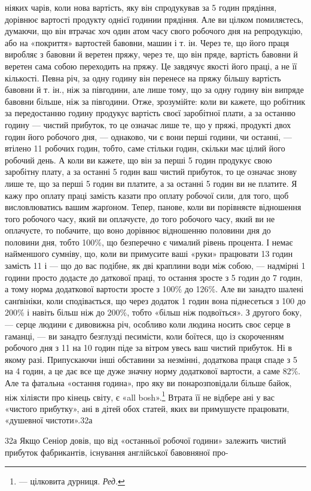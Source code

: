 ніяких чарів, коли нова вартість, яку він спродукував за 5 годин прядіння, дорівнює вартості
продукту однієї годинии прядіння. Але ви цілком помиляєтесь, думаючи, що він втрачає хоч один атом
часу свого робочого дня на репродукцію, або на «покриття» вартостей бавовни, машин і т. ін. Через
те, що його праця виробляє з бавовни й веретен пряжу, через те, що він пряде, вартість бавовни й
веретен сама собою переходить на пряжу.
Це завдячує якості його праці, а не її кількості. Певна річ, за одну годину він перенесе на пряжу
більшу вартість бавовни й т. ін., ніж за півгодини, але лише тому, що за одну годину він випряде
бавовни більше, ніж за півгодини. Отже, зрозумійте: коли ви кажете, що робітник за передостанню
годину продукує вартість своєї заробітної плати, а за останню годину — чистий прибуток, то це
означає лише те, що у пряжі, продукті двох годин його робочого дня, — однаково, чи є вони перші
години, чи останні, — втілено 11 робочих годин, тобто, саме стільки годин, скільки має цілий
його робочий день. А коли ви кажете, що він за перші 5 годин продукує свою заробітну плату, а за
останні 5 годин ваш чистий прибуток, то це означає знову лише те, що за перші 5 годин ви
платите, а за останні 5 годин
ви не платите. Я кажу про оплату праці замість казати про оплату робочої сили, для того, щоб
висловлюватись вашим жарґоном. Тепер, панове, коли ви порівняєте відношення того робочого
часу, який ви оплачуєте, до того робочого часу, який ви не оплачуєте, то побачите, що воно дорівнює
відношенню половини дня до половини дня, тобто 100\%, що безперечно є чималий рівень процента. І
немає найменшого сумніву, що, коли ви примусите ваші «руки» працювати 13 годин замість 11 і — що
до вас подібне, як дві краплини води між собою, — надмірні 1 години просто додасте до даткової
праці, то остання зросте з 5 годин до 7 годин, а тому норма додаткової вартости зросте з
100\% до 126\%. Але ви занадто шалені санґвініки, коли сподівається, що через додаток 1 годин
вона піднесеться з 100 до 200\% і навіть більш ніж до 200\%, тобто «більш ніж подвоїться». З другого
боку, — серце людини є дивовижна річ, особливо коли людина носить своє серце в гаманці, — ви занадто
безглузді песимісти, коли боїтеся, що із скороченням робочого
дня з 11 на 10 годин піде за вітром увесь ваш чистий прибуток. Ні в якому разі. Припускаючи
інші обставини за незмінні,
додаткова праця спаде з 5 на 4 годин, а це дає все ще дуже значну норму додаткової вартости,
а саме 82\%. Але та фатальна «остання година», про яку ви понарозповідали більше байок, ніж
хіліясти про кінець світу, є «all bosh».\footnote*{
— цілковита дурниця. \emph{Ред.}
} Втрата її не відбере ані у вас «чистого прибутку», ані в
дітей обох статей, яких ви примушуєте працювати, «душевної чистоти».32а

32а Якщо Сеніор довів, що від «останньої робочої години» залежить чистий прибуток фабрикантів,
існування англійської бавовняної про-